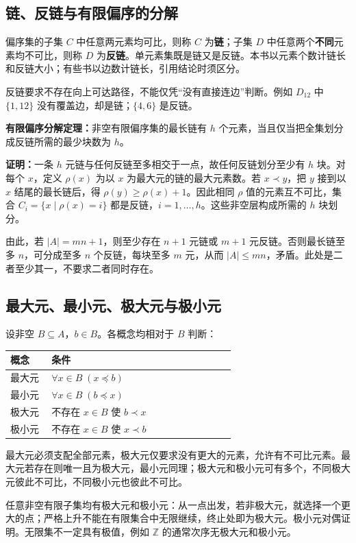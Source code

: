 \documentclass[UTF8,fontset=none,zihao=-4,a4paper]{ctexart}
\newcommand{\term}[1]{\textbf{#1}}
\begin{document}
\subsection{链、反链与有限偏序的分解}
偏序集的子集 $C$ 中任意两元素均可比，则称 $C$ 为\term{链}；子集 $D$ 中任意两个\term{不同}元素均不可比，则称 $D$ 为\term{反链}。单元素集既是链又是反链。本书以元素个数计链长和反链大小；有些书以边数计链长，引用结论时须区分。

反链要求不存在向上可达路径，不能仅凭“没有直接连边”判断。例如 $D_{12}$ 中 $\{1,12\}$ 没有覆盖边，却是链；$\{4,6\}$ 是反链。

\term{有限偏序分解定理：}非空有限偏序集的最长链有 $h$ 个元素，当且仅当把全集划分成反链所需的最少块数为 $h$。

\term{证明：}一条 $h$ 元链与任何反链至多相交于一点，故任何反链划分至少有 $h$ 块。对每个 $x$，定义 $\rho(x)$ 为以 $x$ 为最大元的链的最大元素数。若 $x\prec y$，把 $y$ 接到以 $x$ 结尾的最长链后，得 $\rho(y)\ge\rho(x)+1$。因此相同 $\rho$ 值的元素互不可比，集合 $C_i=\{x\mid\rho(x)=i\}$ 都是反链，$i=1,\ldots,h$。这些非空层构成所需的 $h$ 块划分。

由此，若 $|A|=mn+1$，则至少存在 $n+1$ 元链或 $m+1$ 元反链。否则最长链至多 $n$，可分成至多 $n$ 个反链，每块至多 $m$ 元，从而 $|A|\le mn$，矛盾。此处是二者至少其一，不要求二者同时存在。

\subsection{最大元、最小元、极大元与极小元}
设非空 $B\subseteq A$，$b\in B$。各概念均相对于 $B$ 判断：
\begin{longtable}{p{0.17\linewidth}p{0.76\linewidth}}
\toprule 概念 & 条件\\\midrule\endhead
最大元 & $\forall x\in B\;(x\preceq b)$\\
最小元 & $\forall x\in B\;(b\preceq x)$\\
极大元 & 不存在 $x\in B$ 使 $b\prec x$\\
极小元 & 不存在 $x\in B$ 使 $x\prec b$\\\bottomrule
\end{longtable}
最大元必须支配全部元素，极大元仅要求没有更大的元素，允许有不可比元素。最大元若存在则唯一且为极大元，最小元同理；极大元和极小元可有多个，不同极大元彼此不可比，不同极小元也彼此不可比。

任意非空有限子集均有极大元和极小元：从一点出发，若非极大元，就选择一个更大的点；严格上升不能在有限集合中无限继续，终止处即为极大元。极小元对偶证明。无限集不一定具有极值，例如 $\mathbb Z$ 的通常次序无极大元和极小元。
\end{document}
